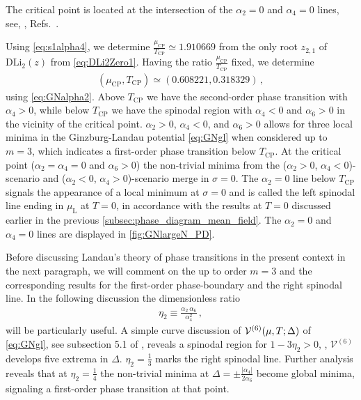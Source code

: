 The critical point is located at the intersection of the $\alpha_2 = 0$ and $\alpha_4 = 0$ lines, see, \eg{}, Refs.~\cite{Buballa:2014tba,Buballa:2018hux}.

Using \cref{eq:s1alpha4}, we determine $\tfrac{\mu_\mathrm{CP}}{T_\mathrm{CP}} \simeq 1.910669$ from the only root $z_{2,1}$ of $\mathrm{DLi}_{2}(z)$ from \cref{eq:DLi2Zero1}.
Having the ratio $\tfrac{\mu_\mathrm{CP}}{T_\mathrm{CP}}$ fixed, we determine
\begin{align}
	(\mu_\mathrm{CP}, T_\mathrm{CP} ) \simeq ( 0.608221, 0.318329 ) \, ,\label{eq:muCPTCP_MF}
\end{align}
using \cref{eq:GNalpha2}.
Above $T_\mathrm{CP}$ we have the second-order phase transition with $\alpha_4 > 0$, while below $T_\mathrm{CP}$ we have the spinodal region with $\alpha_4 < 0$ and $\alpha_6 > 0$ in the vicinity of the critical point. 
$\alpha_2 > 0$, $\alpha_4 < 0$, and $\alpha_6 > 0$ allows for three local minima in the Ginzburg-Landau potential \eqref{eq:GNgl} when considered up to $m = 3$, which indicates a first-order phase transition below $T_\mathrm{CP}$.
At the critical point ($\alpha_2 = \alpha_4=0$ and $\alpha_6 > 0$) the non-trivial minima from the ($\alpha_2 > 0$, $\alpha_4 < 0$)-scenario and ($\alpha_2 < 0$, $\alpha_4 > 0$)-scenario merge in $\sigma = 0$.
The $\alpha_2 = 0$ line below $T_\mathrm{CP}$ signals the appearance of a local minimum at $\sigma = 0$ and is called the left spinodal line ending in $\mu_\mathrm{L}$ at $T = 0$, in accordance with the results at $T = 0$ discussed earlier in the previous \cref{subsec:phase_diagram_mean_field}. 
The $\alpha_2=0$ and $\alpha_4=0$ lines are displayed in \cref{fig:GNlargeN_PD}.

Before discussing Landau’s theory of phase transitions in the present context in the next paragraph, we will comment on the \gle{} up to order $m=3$ and the corresponding results for the first-order phase-boundary and the right spinodal line.
In the following discussion the dimensionless ratio
\begin{align}
\eta_2\equiv \frac{\alpha_2 \,\alpha_6}{\alpha_4^2}\,,
\label{eq:GLeta2}
\end{align}
will be particularly useful.
A simple curve discussion of $\VeffArgs[][(6)]{\muT;\Delta}$ of \cref{eq:GNgl}, see subsection 5.1 of , reveals a spinodal region for $1-3\eta_2>0$, \ie{}, $\mathcal{V}^{(6)}$ develops five extrema in $\Delta$.
$\eta_2=\frac{1}{3}$ marks the right spinodal line.
Further analysis reveals that at $\eta_2=\frac{1}{4}$ the non-trivial minima at $\Delta=\pm\frac{|\alpha_4|}{2\alpha_6}$ become global minima, signaling a first-order phase transition at that point.

